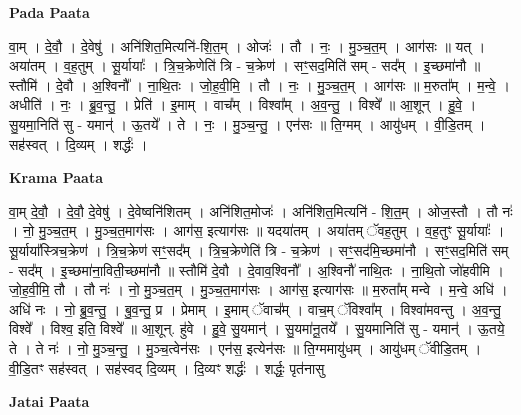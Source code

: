 \documentclass[17pt]{extarticle}
\begin{document}
\textbf{Pada Paata} \newline

वा॒म् । दे॒वौ॒ । दे॒वेषु॑ । अनि॑शित॒मित्यनि॑-शि॒त॒म् । ओजः॑ । तौ । नः॒ । मु॒ञ्च॒त॒म् । आग॑सः ॥ यत् । अया॑तम् । व॒ह॒तुम् । सू॒र्यायाः᳚ । त्रि॒च॒क्रेणेति॑ त्रि - च॒क्रेण॑ । सꣳ॒॒सद॒मिति॑ सम् - सद᳚म् । इ॒च्छमा॑नौ ॥ स्तौमि॑ । दे॒वौ । अ॒श्विनौ᳚ । ना॒थि॒तः । जो॒ह॒वी॒मि॒ । तौ । नः॒ । मु॒ञ्च॒त॒म् । आग॑सः ॥ म॒रुता᳚म् । म॒न्वे॒ । अधीति॑ । नः॒ । ब्रु॒व॒न्तु॒ । प्रेति॑ । इ॒माम् । वाच᳚म् । विश्वा᳚म् । अ॒व॒न्तु॒ । विश्वे᳚ ॥ आ॒शून् । हु॒वे॒ । सु॒यमा॒निति॑ सु - यमान्॑ । ऊ॒तये᳚ । ते । नः॒ । मु॒ञ्च॒न्तु॒ । एन॑सः ॥ ति॒ग्मम् । आयु॑धम् । वी॒डि॒तम् । सह॑स्वत् । दि॒व्यम् । शर्द्धः॑ ।  \newline


\textbf{Krama Paata} \newline

वा॒म् दे॒वौ॒ । दे॒वौ॒ दे॒वेषु॑ । दे॒वेष्वनि॑शितम् । अनि॑शित॒मोजः॑ । अनि॑शित॒मित्यनि॑ - शि॒त॒॒म् । ओज॒स्तौ । 
तौ नः॑ । नो॒ मु॒ञ्च॒त॒म् । मु॒ञ्च॒त॒माग॑सः । आग॑स॒ इत्याग॑सः ॥ यदया॑तम् । अया॑तम् ॅवह॒तुम् । व॒ह॒तुꣳ सू॒र्यायाः᳚ । सू॒र्याया᳚स्त्रिच॒क्रेण॑ । त्रि॒च॒क्रेण॑ सꣳ॒॒सद᳚म् । त्रि॒च॒क्रेणेति॑ त्रि - च॒क्रेण॑ । सꣳ॒॒सद॑मि॒च्छमा॑नौ । सꣳ॒॒सद॒मिति॑ सम् - सद᳚म् । इ॒च्छमा॑ना॒विती॒च्छमा॑नौ ॥ स्तौमि॑ दे॒वौ । दे॒वाव॒श्विनौ᳚ । अ॒श्विनौ॑ नाथि॒तः । ना॒थि॒तो जो॑हवीमि । जो॒ह॒वी॒मि॒ तौ । तौ नः॑ । नो॒ मु॒ञ्च॒त॒म् । मु॒ञ्च॒त॒माग॑सः । आग॑स॒ इत्याग॑सः ॥ म॒रुता᳚म् मन्वे । म॒न्वे॒ अधि॑ । अधि॑ नः । नो॒ ब्रु॒व॒न्तु॒ । बु॒व॒न्तु॒ प्र । प्रेमाम् । इ॒माम् ॅवाच᳚म् । वाच॒म् ॅविश्वा᳚म् । विश्वा॑मवन्तु । अ॒व॒न्तु॒ विश्वे᳚ । विश्व॒ इति॒ विश्वे᳚ ॥ आ॒शून्. हु॑वे । हु॒वे॒ सु॒यमान्॑ । सु॒यमा॑नू॒तये᳚ । सु॒यमानिति॑ सु - यमान्॑ । ऊ॒तये॒ ते । ते नः॑ । नो॒ मु॒ञ्च॒न्तु॒ । मु॒ञ्च॒त्वेन॑सः । एन॑स॒ इत्येन॑सः ॥ ति॒ग्ममायु॑धम् । आयु॑धम् ॅवीडि॒तम् । वी॒डि॒तꣳ सह॑स्वत् । सह॑स्वद् दि॒व्यम् । दि॒व्यꣳ शर्द्धः॑ । शर्द्धः॒ पृत॑नासु \newline

\textbf{Jatai Paata} \newline
\end{document}
